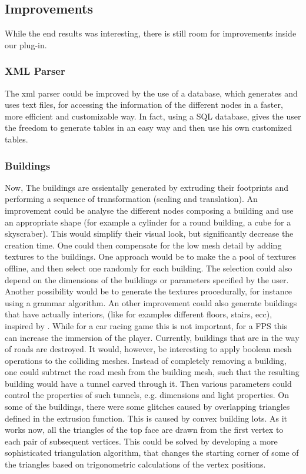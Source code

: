 \documentclass[conference]{IEEEtran}
\begin{document}
\subsection{Improvements}

While the end results was interesting, there is still room for improvements inside our plug-in.

\subsubsection{XML Parser}

The xml parser could be improved by the use of a database, which generates and uses text files, for accessing the information of the different nodes in a faster, more efficient and customizable way. In fact, using a SQL database, gives the user the freedom to generate tables in an easy way and then use his own customized tables.

\subsubsection{Buildings}
Now, The buildings are essientally generated by extruding their footprints and performing a sequence of transformation (scaling and translation). An improvement could be analyse the different nodes composing a building and use an appropriate shape (for example a cylinder for a round building, a cube for a skyscraber). This would simplify their visual look, but significantly decrease the creation time. One could then compensate for the low mesh detail by adding textures to the buildings. One approach would be to make the a pool of textures offline, and then select one randomly for each building. The selection could also depend on the dimensions of the buildings or parameters specified by the user. Another possibility would be to generate the textures procedurally, for instance using a grammar algorithm. An other improvement could also generate buildings that have actually interiors, (like for examples different floors, stairs, ecc), inspired by \cite{afghan}. While for a car racing game this is not important, for a FPS this can increase the immersion of the player. \newline\newline
Currently, buildings that are in the way of roads are destroyed. It would, however, be interesting to apply boolean mesh operations to the colliding meshes. Instead of completely removing a building, one could subtract the road mesh from the building mesh, such that the resulting building would have a tunnel carved through it. Then various parameters could control the properties of such tunnels, e.g. dimensions and light properties.\newline\newline
 On some of the buildings, there were some glitches caused by overlapping triangles defined in the extrusion function. This is caused by convex building lots. As it works now, all the triangles of the top face are drawn from the first vertex to each pair of subsequent vertices. This could be solved by developing a more sophisticated triangulation algorithm, that changes the starting corner of some of the triangles based on trigonometric calculations of the vertex positions. 
\end{document}

